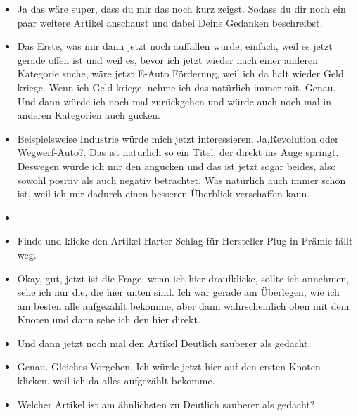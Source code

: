 {\begin{itemize}[]
                  Wenn ich jetzt aber mich noch nicht damit auskennen würde, dann wäre mir das wahrscheinlich nicht so klar.
                  Dann müsste ich mir wahrscheinlich alle Artikel durchlesen, um dann wirklich diese Gegenposition zu finden.
                  Genau so würde ich mich jetzt weiter vorarbeiten.
            \item {} Ja das wäre super, dass du mir das noch kurz zeigst.
                  Sodass du dir noch ein paar weitere Artikel anschaust und dabei Deine Gedanken beschreibst.
            \item {} Das Erste, was mir dann jetzt noch auffallen würde, einfach, weil es jetzt gerade offen ist und weil es, bevor ich jetzt wieder nach einer anderen Kategorie suche, wäre jetzt \flqq E-Auto Förderung\frqq{}, weil ich da halt wieder Geld kriege.
                  Wenn ich Geld kriege, nehme ich das natürlich immer mit.
                  Genau.
                  Und dann würde ich noch mal zurückgehen und würde auch noch mal in anderen Kategorien auch gucken.
            \item {} Beispielsweise Industrie würde mich jetzt interessieren.
                  Ja,\flqq Revolution oder Wegwerf-Auto?\frqq{}.
                  Das ist natürlich so ein Titel, der direkt ins Auge springt.
                  Deswegen würde ich mir den angucken und das ist jetzt sogar beides, also sowohl positiv als auch negativ betrachtet.
                  Was natürlich auch immer schön ist, weil ich mir dadurch einen besseren Überblick verschaffen kann.
            \item {}
            \item {} Finde und klicke den Artikel \flqq Harter Schlag für Hersteller Plug-in Prämie fällt weg\frqq{}.
            \item {} Okay, gut, jetzt ist die Frage, wenn ich hier draufklicke, sollte ich annehmen, sehe ich nur die, die hier unten sind.
                  Ich war gerade am Überlegen, wie ich am besten alle aufgezählt bekomme, aber dann wahrscheinlich oben mit dem Knoten und dann sehe ich den hier direkt.
            \item {} Und dann jetzt noch mal den Artikel \flqq Deutlich sauberer als gedacht\frqq{}.
            \item {} Genau. Gleiches Vorgehen. Ich würde jetzt hier auf den ersten Knoten klicken, weil ich da alles aufgezählt bekomme.
            \item {} Welcher Artikel ist am ähnlichsten zu \flqq Deutlich sauberer als gedacht\frqq{}?

\end{itemize}}
